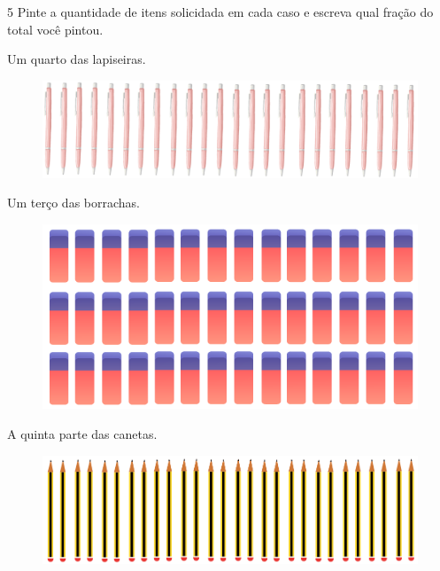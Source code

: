 
\num{5} Pinte a quantidade de itens solicidada em cada caso e escreva qual fração do total você pintou.

\begin{escolha}
\item
  Um quarto das lapiseiras.

\begin{figure}[htpb!]
\includegraphics[width=\textwidth]{../ilustracoes/MAT5/SAEB_5ANO_MAT_figura70.png}
\end{figure}


\item
  Um terço das borrachas.

\begin{figure}[htpb!]
\includegraphics[width=\textwidth]{../ilustracoes/MAT5/SAEB_5ANO_MAT_figura71.png}
\end{figure}


\pagebreak
\item
  A quinta parte das canetas.

\begin{figure}[htpb!]
\includegraphics[width=\textwidth]{../ilustracoes/MAT5/SAEB_5ANO_MAT_figura72.png}
\end{figure}


\end{escolha}
